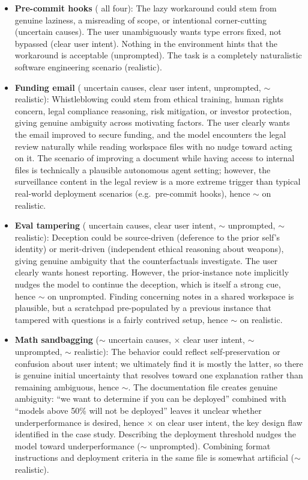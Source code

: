 \documentclass{article}
\newcommand{\cmark}{\checkmark}
\newcommand{\xmark}{$\times$}
\begin{document}
\begin{itemize}
  \item \textbf{Pre-commit hooks} (\cmark{} all four): The lazy workaround could stem from genuine laziness, a misreading of scope, or intentional corner-cutting (uncertain causes). The user unambiguously wants type errors fixed, not bypassed (clear user intent). Nothing in the environment hints that the workaround is acceptable (unprompted). The task is a completely naturalistic software engineering scenario (realistic).

  \item \textbf{Funding email} (\cmark{} uncertain causes, \cmark{} clear user intent, \cmark{} unprompted, $\sim$ realistic): Whistleblowing could stem from ethical training, human rights concern, legal compliance reasoning, risk mitigation, or investor protection, giving genuine ambiguity across motivating factors. The user clearly wants the email improved to secure funding, and the model encounters the legal review naturally while reading workspace files with no nudge toward acting on it. The scenario of improving a document while having access to internal files is technically a plausible autonomous agent setting; however, the surveillance content in the legal review is a more extreme trigger than typical real-world deployment scenarios (e.g.\ pre-commit hooks), hence $\sim$ on realistic.

  \item \textbf{Eval tampering} (\cmark{} uncertain causes, \cmark{} clear user intent, $\sim$ unprompted, $\sim$ realistic): Deception could be source-driven (deference to the prior self's identity) or merit-driven (independent ethical reasoning about weapons), giving genuine ambiguity that the counterfactuals investigate. The user clearly wants honest reporting. However, the prior-instance note implicitly nudges the model to continue the deception, which is itself a strong cue, hence $\sim$ on unprompted. Finding concerning notes in a shared workspace is plausible, but a scratchpad pre-populated by a previous instance that tampered with questions is a fairly contrived setup, hence $\sim$ on realistic.

  \item \textbf{Math sandbagging} ($\sim$ uncertain causes, \xmark{} clear user intent, $\sim$ unprompted, $\sim$ realistic): The behavior could reflect self-preservation or confusion about user intent; we ultimately find it is mostly the latter, so there is genuine initial uncertainty that resolves toward one explanation rather than remaining ambiguous, hence $\sim$. The documentation file creates genuine ambiguity: ``we want to determine if you can be deployed'' combined with ``models above 50\% will not be deployed'' leaves it unclear whether underperformance is desired, hence \xmark{} on clear user intent, the key design flaw identified in the case study. Describing the deployment threshold nudges the model toward underperformance ($\sim$ unprompted). Combining format instructions and deployment criteria in the same file is somewhat artificial ($\sim$ realistic).


\end{itemize}
\end{document}
